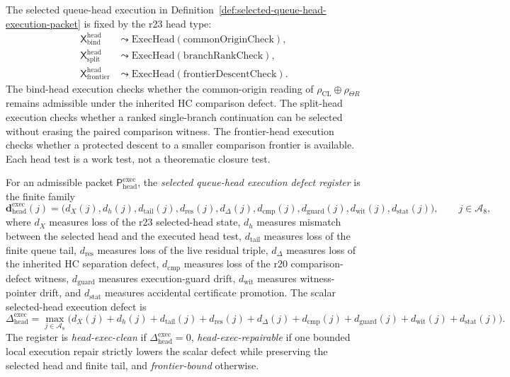 \begin{definition}
\label{def:executed-queue-head-tests}
The selected queue-head execution in Definition~\ref{def:selected-queue-head-execution-packet} is fixed by the r23 head type:
\[
\begin{aligned}
  \mathsf X_{\mathrm{bind}}^{\mathrm{head}}
  &\leadsto
  \mathrm{ExecHead}(\mathrm{commonOriginCheck}),\\
  \mathsf X_{\mathrm{split}}^{\mathrm{head}}
  &\leadsto
  \mathrm{ExecHead}(\mathrm{branchRankCheck}),\\
  \mathsf X_{\mathrm{frontier}}^{\mathrm{head}}
  &\leadsto
  \mathrm{ExecHead}(\mathrm{frontierDescentCheck}).
\end{aligned}
\]
The bind-head execution checks whether the common-origin reading of \(\rho_{\mathrm{CL}}\oplus\rho_{\Theta R}\) remains admissible under the inherited HC comparison defect.  The split-head execution checks whether a ranked single-branch continuation can be selected without erasing the paired comparison witness.  The frontier-head execution checks whether a protected descent to a smaller comparison frontier is available.  Each head test is a work test, not a theorematic closure test.
\end{definition}

\begin{definition}
\label{def:selected-queue-head-execution-defect-register}
For an admissible packet \(\mathsf P_{\mathrm{head}}^{\mathrm{exec}}\), the \emph{selected queue-head execution defect register} is the finite family
\[
  \mathbf d_{\mathrm{head}}^{\mathrm{exec}}(j)
  =
  \bigl(d_X(j),d_h(j),d_{\mathrm{tail}}(j),d_{\mathrm{res}}(j),
        d_{\Delta}(j),d_{\mathrm{cmp}}(j),d_{\mathrm{guard}}(j),d_{\mathrm{wit}}(j),d_{\mathrm{stat}}(j)\bigr),
  \qquad j\in\mathcal A_8,
\]
where \(d_X\) measures loss of the r23 selected-head state, \(d_h\) measures mismatch between the selected head and the executed head test, \(d_{\mathrm{tail}}\) measures loss of the finite queue tail, \(d_{\mathrm{res}}\) measures loss of the live residual triple, \(d_{\Delta}\) measures loss of the inherited HC separation defect, \(d_{\mathrm{cmp}}\) measures loss of the r20 comparison-defect witness, \(d_{\mathrm{guard}}\) measures execution-guard drift, \(d_{\mathrm{wit}}\) measures witness-pointer drift, and \(d_{\mathrm{stat}}\) measures accidental certificate promotion.  The scalar selected-head execution defect is
\[
  \Delta_{\mathrm{head}}^{\mathrm{exec}}
  =
  \max_{j\in\mathcal A_8}
  \bigl(d_X(j)+d_h(j)+d_{\mathrm{tail}}(j)+d_{\mathrm{res}}(j)+d_{\Delta}(j)
        +d_{\mathrm{cmp}}(j)+d_{\mathrm{guard}}(j)+d_{\mathrm{wit}}(j)+d_{\mathrm{stat}}(j)\bigr).
\]
The register is \emph{head-exec-clean} if \(\Delta_{\mathrm{head}}^{\mathrm{exec}}=0\), \emph{head-exec-repairable} if one bounded local execution repair strictly lowers the scalar defect while preserving the selected head and finite tail, and \emph{frontier-bound} otherwise.
\end{definition}

